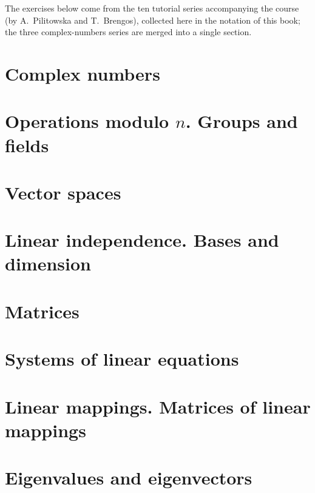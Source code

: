 The exercises below come from the ten tutorial series accompanying the course (by A.~Pilitowska and
T.~Brengos), collected here in the notation of this book; the three complex-numbers series are merged
into a single section.


\clearpage
\section{Complex numbers}



\clearpage
\section{Operations modulo \texorpdfstring{$n$}{n}. Groups and fields}



\clearpage
\section{Vector spaces}



\clearpage
\section{Linear independence. Bases and dimension}



\clearpage
\section{Matrices}



\clearpage
\section{Systems of linear equations}



\clearpage
\section{Linear mappings. Matrices of linear mappings}



\clearpage
\section{Eigenvalues and eigenvectors}


